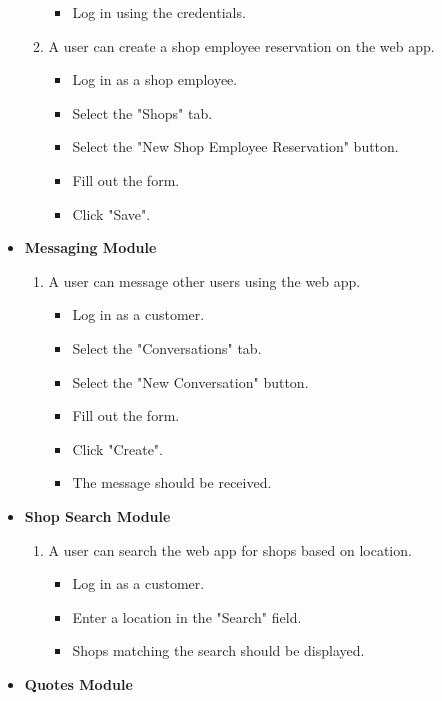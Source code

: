 \documentclass[12pt, titlepage]{article}
\begin{document}
\begin{itemize}
\begin{enumerate}
\begin{itemize}
            \item Log in using the credentials.
        \end{itemize}
        \item A user can create a shop employee reservation on the web app.
        \begin{itemize}
            \item Log in as a shop employee.
            \item Select the "Shops" tab.
            \item Select the "New Shop Employee Reservation" button.
            \item Fill out the form.
            \item Click "Save".
        \end{itemize}
    \end{enumerate}
        \item \textbf{Messaging Module}
    \begin{enumerate}
        \item A user can message other users using the web app.
        \begin{itemize}
            \item Log in as a customer.
            \item Select the "Conversations" tab.
            \item Select the "New Conversation" button.
            \item Fill out the form.
            \item Click "Create".
            \item The message should be received.
        \end{itemize}
    \end{enumerate}
    \item \textbf{Shop Search Module}
    \begin{enumerate}
        \item A user can search the web app for shops based on location.
        \begin{itemize}
            \item Log in as a customer.
            \item Enter a location in the "Search" field.
            \item Shops matching the search should be displayed.
        \end{itemize}
    \end{enumerate}
    \item \textbf{Quotes Module}

\end{itemize}
\end{document}
